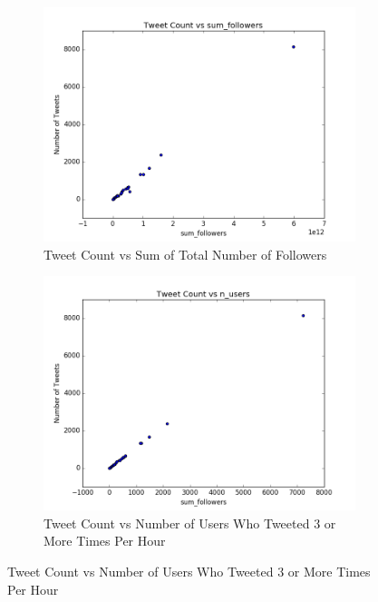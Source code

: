 \documentclass[12pt]{article}
\begin{document}
\begin{figure}[H]
\centering
\begin{subfigure}{.45\textwidth}
  \centering
\includegraphics[width=\textwidth]{figures/count_vs_sum_tweets_superbowl.png}
\caption{Tweet Count vs Sum of Total Number of Followers}
\label{part1:fig:LC}
\end{subfigure}%
\hfill
\begin{subfigure}{.45\textwidth}
  \centering
\includegraphics[width=\textwidth]{figures/count_vs_n_users_tweets_superbowl.png}
\caption{Tweet Count vs Number of Users Who Tweeted 3 or More Times Per Hour}
\label{part1:fig:LC}
\end{subfigure}


\end{figure}
\end{document}
